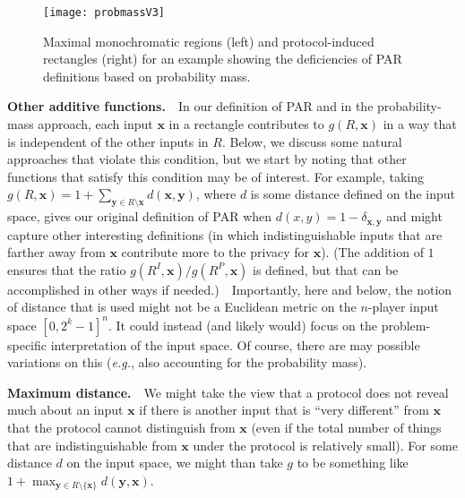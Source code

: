 \documentclass{article}
\theoremstyle{theorem}
\theoremstyle{definition}
\theoremstyle{remark}
\newcommand{\eg}{\emph{e.g.}}
\begin{document}
\begin{figure}[htp]
\begin{center}
\texttt{[image: probmassV3]}
\caption{\small Maximal monochromatic regions (left) and protocol-induced rectangles (right) for an example showing the deficiencies of PAR definitions based on probability mass. }\label{fig:prob-mass}
\end{center}
\end{figure}



\textbf{Other additive functions.}\ \ In our definition of PAR and in the probability-mass approach, each input $\mathbf{x}$ in a rectangle contributes to $g(R,\mathbf{x})$ in a way that is independent of the other inputs in $R$.  Below, we discuss some natural approaches that violate this condition, but we start by noting that other functions that satisfy this condition may be of interest.  For example, taking $g(R,\mathbf{x}) = 1+\sum_{\mathbf{y}\in R\setminus \mathbf{x}} d(\mathbf{x},\mathbf{y})$, where $d$ is some distance defined on the input space, gives our original definition of PAR when $d(x,y) = 1-\delta_{\mathbf{x},\mathbf{y}}$ and might capture other interesting definitions (in which indistinguishable inputs that are farther away from $\mathbf{x}$ contribute more to the privacy for $\mathbf{x}$).  (The addition of $1$ ensures that the ratio $g(R^I,\mathbf{x})/g(R^P,\mathbf{x})$ is defined, but that can be accomplished in other ways if needed.)\ \ Importantly, here and below, the notion of distance that is used might not be a Euclidean metric on the $n$-player input space $[0,2^k-1]^n$.  It could instead (and likely would) focus on the problem-specific interpretation of the input space.  Of course, there are may possible variations on this (\eg, also accounting for the probability mass).

\textbf{Maximum distance.}\ \ We might take the view that a protocol does not reveal much about an input $\mathbf{x}$ if there is another input that is ``very different'' from $\mathbf{x}$ that the protocol cannot distinguish from $\mathbf{x}$ (even if the total number of things that are indistinguishable from $\mathbf{x}$ under the protocol is relatively small).  For some distance $d$ on the input space, we might than take $g$ to be something like $1+\max_{\mathbf{y}\in R\setminus\{\mathbf{x}\}} d(\mathbf{y},\mathbf{x})$.
\end{document}

